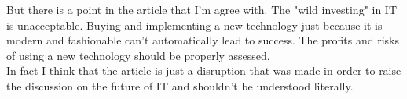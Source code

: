 \documentclass[7pt]{article}
\begin{document}
\noindent
But there is a point in the article that I'm agree with. The "wild investing" in IT is unacceptable. Buying and implementing a new technology just because it is modern and fashionable can't automatically lead to success. The profits and risks of using a new technology should be properly assessed.\\

\noindent
In fact I think that the article is just a disruption that was made in order to raise the discussion on the future of IT and shouldn't be understood literally.


\scriptsize
\nocite{*}


\end{document}
